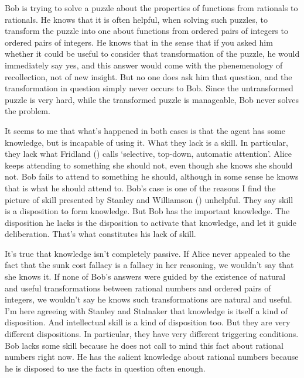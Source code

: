 \documentclass[
  11pt,
  letterpaper,
  DIV=11,
  numbers=noendperiod,
  twoside]{scrartcl}
\begin{document}
Bob is trying to solve a puzzle about the properties of functions from
rationals to rationals. He knows that it is often helpful, when solving
such puzzles, to transform the puzzle into one about functions from
ordered pairs of integers to ordered pairs of integers. He knows that in
the sense that if you asked him whether it could be useful to consider
that transformation of the puzzle, he would immediately say yes, and
this answer would come with the phenemenology of recollection, not of
new insight. But no one does ask him that question, and the
transformation in question simply never occurs to Bob. Since the
untransformed puzzle is very hard, while the transformed puzzle is
manageable, Bob never solves the problem.

It seems to me that what's happened in both cases is that the agent has
some knowledge, but is incapable of using it. What they lack is a skill.
In particular, they lack what Fridland
() calls `selective, top-down,
automatic attention'. Alice keeps attending to something she should not,
even though she knows she should not. Bob fails to attend to something
he should, although in some sense he knows that is what he should attend
to. Bob's case is one of the reasons I find the picture of skill
presented by Stanley and Williamson
() unhelpful. They say skill
is a disposition to form knowledge. But Bob has the important knowledge.
The disposition he lacks is the disposition to activate that knowledge,
and let it guide deliberation. That's what constitutes his lack of
skill.

It's true that knowledge isn't completely passive. If Alice never
appealed to the fact that the sunk cost fallacy is a fallacy in her
reasoning, we wouldn't say that she knows it. If none of Bob's answers
were guided by the existence of natural and useful transformations
between rational numbers and ordered pairs of integers, we wouldn't say
he knows such transformations are natural and useful. I'm here agreeing
with Stanley and Stalnaker that knowledge is itself a kind of
disposition. And intellectual skill is a kind of disposition too. But
they are very different dispositions. In particular, they have very
different triggering conditions. Bob lacks some skill because he does
not call to mind this fact about rational numbers right now. He has the
salient knowledge about rational numbers because he is disposed to use
the facts in question often enough.
\end{document}
